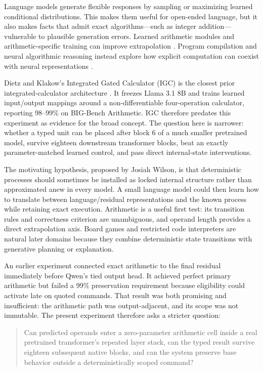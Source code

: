 \documentclass[11pt]{article}
\begin{document}
Language models generate flexible responses by sampling or maximizing learned
conditional distributions. This makes them useful for open-ended language,
but it also makes facts that admit exact algorithms---such as integer
addition---vulnerable to plausible generation errors. Learned arithmetic
modules and arithmetic-specific training can improve extrapolation
\cite{trask2018,jelassi2023,cho2024}. Program compilation and neural
algorithmic reasoning instead explore how explicit computation can coexist
with neural representations \cite{lindner2023,bounsi2024,saldyt2024}.

Dietz and Klakow's Integrated Gated Calculator (IGC) is the closest prior
integrated-calculator architecture \cite{dietz2025}. It freezes Llama 3.1 8B
and trains learned input/output mappings around a non-differentiable
four-operation calculator, reporting 98--99\% on BIG-Bench Arithmetic. IGC
therefore predates this experiment as evidence for the broad concept. The
question here is narrower: whether a typed unit can be placed after block 6 of
a much smaller pretrained model, survive eighteen downstream transformer
blocks, beat an exactly parameter-matched learned control, and pass direct
internal-state interventions.

The motivating hypothesis, proposed by Josiah Wilson, is that deterministic
processes should sometimes be installed as locked internal structure rather
than approximated anew in every model. A small language model could then learn
how to translate between language/residual representations and the known
process while retaining exact execution. Arithmetic is a useful first test:
its transition rules and correctness criterion are unambiguous, and operand
length provides a direct extrapolation axis. Board games and restricted code
interpreters are natural later domains because they combine deterministic
state transitions with generative planning or explanation.

An earlier experiment connected exact arithmetic to the final residual
immediately before Qwen's tied output head. It achieved perfect primary
arithmetic but failed a 99\% preservation requirement because eligibility
could activate late on quoted commands. That result was both promising and
insufficient: the arithmetic path was output-adjacent, and its scope was not
immutable. The present experiment therefore asks a stricter question:

\begin{quote}
Can predicted operands enter a zero-parameter arithmetic cell inside a real
pretrained transformer's repeated layer stack, can the typed result survive
eighteen subsequent native blocks, and can the system preserve base behavior
outside a deterministically scoped command?
\end{quote}
\end{document}
